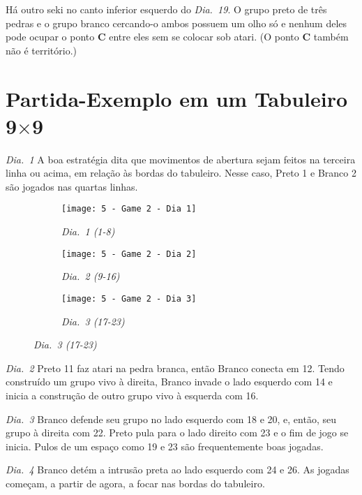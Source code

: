 \begin{itemize}
      Há outro seki no canto inferior esquerdo do \emph{Dia.\@~19}. O grupo preto de três pedras e o grupo branco cercando-o ambos possuem um olho só e nenhum deles pode ocupar o ponto \textbf{C} entre eles sem se colocar sob atari. (O ponto \textbf{C} também não é território.)
\end{itemize}

\pagebreak

\section{Partida-Exemplo em um Tabuleiro \texorpdfstring{9$\times$9}{9x9}}

\emph{Dia.\@~1} A boa estratégia dita que movimentos de abertura sejam feitos na terceira linha ou acima, em relação às bordas do tabuleiro. Nesse caso, Preto 1 e Branco 2 são jogados nas quartas linhas.

\begin{figure}[h!]
  \centering
  \begin{subfigure}[t]{.3\textwidth}
      \centering
      \texttt{[image: 5 - Game 2 - Dia 1]}
      \caption*{\emph{Dia.\@~1 (1-8)}}
  \end{subfigure}
  \hfill
  \begin{subfigure}[t]{.3\textwidth}
      \centering
      \texttt{[image: 5 - Game 2 - Dia 2]}
      \caption*{\emph{Dia.\@~2 (9-16)}}
  \end{subfigure}
  \hfill
  \begin{subfigure}[t]{.3\textwidth}
    \centering
    \texttt{[image: 5 - Game 2 - Dia 3]}
    \caption*{\emph{Dia.\@~3 (17-23)}}
  \end{subfigure}
\end{figure}

\emph{Dia.\@~2} Preto 11 faz atari na pedra branca, então Branco conecta em 12. Tendo construído um grupo vivo à direita, Branco invade o lado esquerdo com 14 e inicia a construção de outro grupo vivo à esquerda com 16.

\emph{Dia.\@~3} Branco defende seu grupo no lado esquerdo com 18 e 20, e, então, seu grupo à direita com 22. Preto pula para o lado direito com 23 e o fim de jogo se inicia. Pulos de um espaço como 19 e 23 são frequentemente boas jogadas.

\emph{Dia.\@~4} Branco detém a intrusão preta ao lado esquerdo com 24 e 26. As jogadas começam, a partir de agora, a focar nas bordas do tabuleiro.

